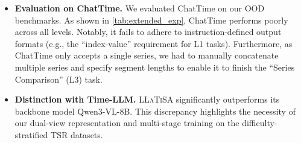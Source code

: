 \documentclass[11pt]{article}
\begin{document}
\begin{itemize}[left=0pt]
    \item \textbf{Evaluation on ChatTime.} We evaluated ChatTime on our OOD benchmarks. As shown in \cref{tab:extended_exp}, ChatTime performs poorly across all levels. Notably, it fails to adhere to instruction-defined output formats (e.g., the ``index-value'' requirement for L1 tasks). Furthermore, as ChatTime only accepts a single series, we had to manually concatenate multiple series and specify segment lengths to enable it to finish the ``Series Comparison'' (L3) task.
    \item \textbf{Distinction with Time-LLM.} \textsc{LLaTiSA} significantly outperforms its backbone model Qwen3-VL-8B. This discrepancy highlights the necessity of our dual-view representation and multi-stage training on the difficulty-stratified TSR datasets.
\end{itemize}

\begin{table}[htbp]
\centering
\setlength{\tabcolsep}{8pt}
\renewcommand{\arraystretch}{1.2}
\caption{Performance comparison on \textbf{out-of-distribution datasets} across L1-L3 with ChatTime.}
\label{tab:extended_exp}
\end{table}
\end{document}
